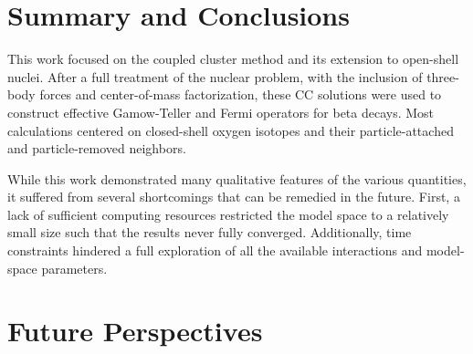 \documentclass[../thesis.tex]{subfiles}
\begin{document}
\section{Summary and Conclusions}

This work focused on the coupled cluster method and its extension to open-shell nuclei.  After a full treatment of the nuclear problem, with the inclusion of three-body forces and center-of-mass factorization, these CC solutions were used to construct effective Gamow-Teller and Fermi operators for beta decays.  Most calculations centered on closed-shell oxygen isotopes and their particle-attached and particle-removed neighbors.

While this work demonstrated many qualitative features of the various quantities, it suffered from several shortcomings that can be remedied in the future.  First, a lack of sufficient computing resources restricted the model space to a relatively small size such that the results never fully converged.  Additionally, time constraints hindered a full exploration of all the available interactions and model-space parameters.

\section{Future Perspectives}
\end{document}
